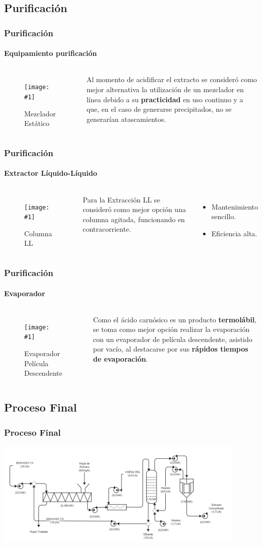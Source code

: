 \documentclass[aspectratio=1610]{beamer}
\newcommand{\fig}[3]{
\begin{columns}
\column{0.4\textwidth}
\begin{figure}[htp] \texttt{[image: \#1]}\caption{#2}\end{figure}
\column{0.6\textwidth}#3
\end{columns}
}
\newcommand{\ssec}{Título de subsección}
\begin{document}
\renewcommand{\ssec}{Purificación}
\subsection{\ssec}
\begin{frame}[c]
	\frametitle{\ssec}
	\framesubtitle{Equipamiento purificación}
	\fig{figs/equipment-inline-mixer.png}{
	Mezclador Estático}{
	Al momento de acidificar el extracto se consideró como mejor alternativa 
	la utilización de un mezclador en línea debido a su \textbf{practicidad} en uso continuo y a que,
	en el caso de generarse precipitados, no se generarían atascamientos.}
\end{frame}
\begin{frame}
	\frametitle{\ssec}
	\framesubtitle{Extractor Líquido-Líquido}
	\fig{figs/equipment-column.png}{Columna LL}{
	Para la Extracción LL se consideró como mejor opción una columna agitada, 
	funcionando en contracorriente.
\begin{itemize}
	\item Mantenimiento sencillo.
	\item Eficiencia alta.
\end{itemize}}
\end{frame}
\begin{frame}
	\frametitle{\ssec}
	\framesubtitle{Evaporador}
	\fig{figs/equipment-evaporator.png}{Evaporador Película Descendente}{
	Como el ácido carnósico es un producto \textbf{termolábil}, 
	se toma como mejor opción realizar la evaporación con un evaporador de película descendente,
	asistido por vacío, al destacarse por sus \textbf{rápidos tiempos de evaporación}.
	}
\end{frame}

\renewcommand{\ssec}{Proceso Final}
\subsection{\ssec}
\begin{frame}
	\frametitle{\ssec}
	\begin{center}
	\includegraphics[width=0.9\textwidth]{figs/equipment-process.png}
	\end{center}
\end{frame}
\end{document}
